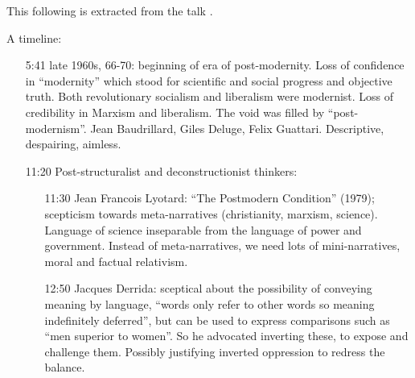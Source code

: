 \documentclass[10pt,titlepage]{book}
\begin{document}
This following is extracted from the talk \cite{pluckrose-evolution}.

A timeline:
\begin{itemize}
\item[5:41] late 1960s, 66-70: beginning of era of post-modernity.
  Loss of confidence in ``modernity'' which stood for scientific and social progress and objective truth.
  Both revolutionary socialism and liberalism were modernist.
  Loss of credibility in Marxism and liberalism.
  The void was filled by ``post-modernism''.
   Jean Baudrillard, Giles Deluge, Felix Guattari.
   Descriptive, despairing, aimless.
 \item[11:20]Post-structuralist and deconstructionist thinkers:

   \begin{itemize}

   \item[11:30] Jean Francois Lyotard: ``The Postmodern Condition'' (1979); scepticism towards meta-narratives (christianity, marxism, science).
     Language of science inseparable from the language of power and government.
     Instead of meta-narratives, we need lots of mini-narratives, moral and factual relativism.

   \item[12:50] Jacques Derrida: sceptical about the possibility of conveying meaning by language, ``words only refer to other words so meaning indefinitely deferred'', but can be used to express comparisons such as ``men superior to women''.  So he advocated inverting these, to expose and challenge them.  Possibly justifying inverted oppression to redress the balance.


\end{itemize}
\end{itemize}
\end{document}

